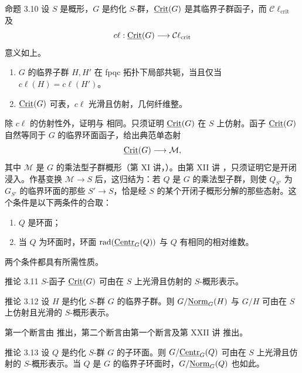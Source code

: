 \begin{sgastatement}{命题 3.10}
设 \(S\) 是概形，\(G\) 是约化 \(S\)-群，\(\underline{\operatorname{Crit}}(G)\) 是其临界子群函子，而 \(\mathcal C\ell_{\mathrm{crit}}\) 及
\[
 c\ell:\underline{\operatorname{Crit}}(G)\longrightarrow\mathcal C\ell_{\mathrm{crit}}
\]
意义如上。
\begin{enumerate}[label=\textup{(\roman*)}]
\item \(G\) 的临界子群 \(H,H'\) 在 fpqc 拓扑下局部共轭，当且仅当 \(c\ell(H)=c\ell(H')\)。
\item \(\underline{\operatorname{Crit}}(G)\) 可表，\(c\ell\) 光滑且仿射，几何纤维整。
\end{enumerate}
\end{sgastatement}

除 \(c\ell\) 的仿射性外，证明与  相同。只须证明 \(\underline{\operatorname{Crit}}(G)\) 在 \(S\) 上仿射。函子 \(\underline{\operatorname{Crit}}(G)\) 自然等同于 \(G\) 的临界环面函子，给出典范单态射
\[
 \underline{\operatorname{Crit}}(G)\longrightarrow\mathcal M,
\]
其中 \(\mathcal M\) 是 \(G\) 的乘法型子群概形（第 XI 讲，）。由第 XII 讲 ，只须证明它是开闭浸入。作基变换 \(\mathcal M\to S\) 后，这归结为：若 \(Q\) 是 \(G\) 的乘法型子群，则使 \(Q_{S'}\) 为 \(G_{S'}\) 的临界环面的那些 \(S'\to S\)，恰是经 \(S\) 的某个开闭子概形分解的那些态射。这个条件是以下两条件的合取：
\begin{enumerate}[label=\textup{(\arabic*)}]
\item \(Q\) 是环面；
\item 当 \(Q\) 为环面时，环面 \(\operatorname{rad}(\underline{\operatorname{Centr}}_G(Q))\) 与 \(Q\) 有相同的相对维数。
\end{enumerate}
两个条件都具有所需性质。

\begin{sgastatement}{推论 3.11}
\(S\)-函子 \(\underline{\operatorname{Crit}}(G)\) 可由在 \(S\) 上光滑且仿射的 \(S\)-概形表示。
\end{sgastatement}

\begin{sgastatement}{推论 3.12}
设 \(H\) 是约化 \(S\)-群 \(G\) 的临界子群。则 \(G/\underline{\operatorname{Norm}}_G(H)\) 与 \(G/H\) 可由在 \(S\) 上仿射且光滑的 \(S\)-概形表示。
\end{sgastatement}

第一个断言由  推出，第二个断言由第一个断言及第 XXII 讲  推出。

\begin{sgastatement}{推论 3.13}
设 \(Q\) 是约化 \(S\)-群 \(G\) 的子环面。则 \(G/\underline{\operatorname{Centr}}_G(Q)\) 可由在 \(S\) 上光滑且仿射的 \(S\)-概形表示。当 \(Q\) 是 \(G\) 的临界子环面时，\(G/\underline{\operatorname{Norm}}_G(Q)\) 也如此。
\end{sgastatement}

